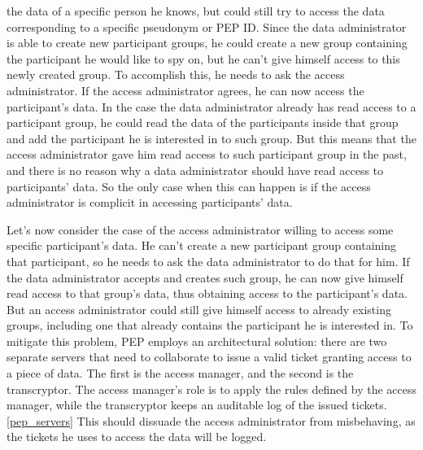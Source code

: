 \documentclass{report}
\begin{document}
the data of a specific person he knows, but could still try to access the data corresponding to a specific pseudonym or PEP ID. Since the data administrator is able to create new
participant groups, he could create a new group containing the participant he would like to spy on, but he can't give himself access to this newly created group. To accomplish this, he needs to 
ask the access administrator. If the access administrator agrees, he can now access the participant's data. In the case the data administrator already has read access to a participant 
group, he could read the data of the participants inside that group and add the participant he is interested in to such group. But this means that the access administrator gave him 
read access to such participant group in the past, and there is no reason why a data administrator should have read access to participants' data. So the only case when this can happen 
is if the access administrator is complicit in accessing participants' data. \par
Let's now consider the case of the access administrator willing to access some specific participant's data. 
He can't create a new participant group containing that participant, so he needs to ask the data administrator to do that for him. If the data administrator accepts and creates such 
group, he can now give himself read access to that group's data, thus obtaining access to the participant's data. But an access administrator could still give himself access to already 
existing groups, including one that already contains the participant he is interested in. To mitigate this problem, PEP employs an architectural solution: there are two separate
servers that need to collaborate to issue a valid ticket granting access to a piece of data. The first is the access manager, and the second is the transcryptor. The access manager's 
role is to apply the rules defined by the access manager, while the transcryptor keeps an auditable log of the issued tickets.\ref{pep_servers} This should dissuade the access 
administrator from misbehaving, as the tickets he uses to access the data will be logged.
\end{document}
